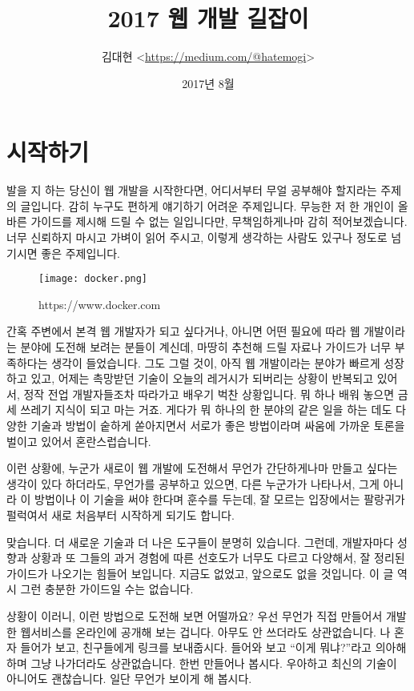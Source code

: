 \documentclass[11pt,a4paper]{article}
\begin{document}
\title{2017 웹 개발 길잡이}
\author{김대현 <\url{https://medium.com/@hatemogi}>}
\date{2017년 8월}
\maketitle
\section{시작하기}

발을 지 하는 당신이 웹 개발을 시작한다면, 어디서부터 무얼 공부해야 할지라는 주제의 글입니다. 감히 누구도 편하게 얘기하기 어려운 주제입니다. 무능한 저 한 개인이 올바른 가이드를 제시해 드릴 수 없는 일입니다만, 무책임하게나마 감히 적어보겠습니다. 너무 신뢰하지 마시고 가벼이 읽어 주시고, 이렇게 생각하는 사람도 있구나 정도로 넘기시면 좋은 주제입니다.

\begin{figure}
\centering
\texttt{[image: docker.png]}
\caption{https://www.docker.com}
\end{figure}

\textsf{간혹 주변에서 본격 웹 개발자가 되고 싶다}거나, 아니면 어떤 필요에 따라 웹 개발이라는 분야에 도전해 보려는 분들이 계신데, 마땅히 추천해 드릴 자료나 가이드가 너무 부족하다는 생각이 들었습니다. 그도 그럴 것이, 아직 웹 개발이라는 분야가 빠르게 성장하고 있고, 어제는 촉망받던 기술이 오늘의 레거시가 되버리는 상황이 반복되고 있어서, 정작 전업 개발자들조차 따라가고 배우기 벅찬 상황입니다. 뭐 하나 배워 놓으면 금세 쓰레기 지식이 되고 마는 거죠. 게다가 뭐 하나의 한 분야의 같은 일을 하는 데도 다양한 기술과 방법이 숱하게 쏟아지면서 서로가 좋은 방법이라며 싸움에 가까운 토론을 벌이고 있어서 혼란스럽습니다.

이런 상황에, 누군가 새로이 웹 개발에 도전해서 무언가 간단하게나마 만들고 싶다는 생각이 있다 하더라도, 무언가를 공부하고 있으면, 다른 누군가가 나타나서, 그게 아니라 이 방법이나 이 기술을 써야 한다며 훈수를 두는데, 잘 모르는 입장에서는 팔랑귀가 펄럭여서 새로 처음부터 시작하게 되기도 합니다.

맞습니다. 더 새로운 기술과 더 나은 도구들이 분명히 있습니다. 그런데, 개발자마다 성향과 상황과 또 그들의 과거 경험에 따른 선호도가 너무도 다르고 다양해서, 잘 정리된 가이드가 나오기는 힘들어 보입니다. 지금도 없었고, 앞으로도 없을 것입니다. 이 글 역시 그런 충분한 가이드일 수는 없습니다.

상황이 이러니, 이런 방법으로 도전해 보면 어떨까요? 우선 무언가 직접 만들어서 개발한 웹서비스를 온라인에 공개해 보는 겁니다. 아무도 안 쓰더라도 상관없습니다. 나 혼자 들어가 보고, 친구들에게 링크를 보내줍시다. 들어와 보고 ``이게 뭐냐?''라고 의아해하며 그냥 나가더라도 상관없습니다. 한번 만들어나 봅시다. 우아하고 최신의 기술이 아니어도 괜찮습니다. 일단 무언가 보이게 해 봅시다.
\end{document}
